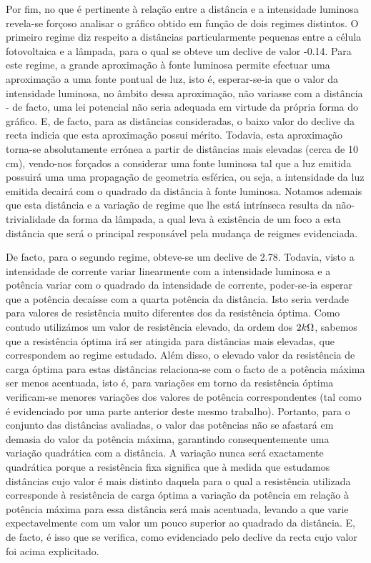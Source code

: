 \documentclass[9pt]{extarticle}
\begin{document}
\begin{multicols}{2}
\par Por fim, no que é pertinente à relação entre a distância e a intensidade luminosa revela-se forçoso analisar o gráfico obtido em função de dois regimes distintos. O primeiro regime diz respeito a distâncias particularmente pequenas entre a célula fotovoltaica e a lâmpada, para o qual se obteve um declive de valor -0.14. Para este regime, a grande aproximação à fonte luminosa permite efectuar uma aproximação a uma fonte pontual de luz, isto é, esperar-se-ia que o valor da intensidade luminosa, no âmbito dessa aproximação, não variasse com a distância - de facto, uma lei potencial não seria adequada em virtude da própria forma do gráfico. E, de facto, para as distâncias consideradas, o baixo valor do declive da recta indicia que esta aproximação possui mérito. Todavia, esta aproximação torna-se absolutamente errónea a partir de distâncias mais elevadas (cerca de 10 cm), vendo-nos forçados a considerar uma fonte luminosa tal que a luz emitida possuirá uma uma propagação de geometria esférica, ou seja, a intensidade da luz emitida decairá com o quadrado da distância à fonte luminosa. Notamos ademais que esta distância e a variação de regime que lhe está intrínseca resulta da não-trivialidade da forma da lâmpada, a qual leva à existência de um foco a esta distância que será o principal responsável pela mudança de reigmes evidenciada.

\par De facto, para o segundo regime, obteve-se um declive de 2.78. Todavia, visto a intensidade de corrente variar linearmente com a intensidade luminosa e a potência variar com o quadrado da intensidade de corrente, poder-se-ia esperar que a potência decaísse com a quarta potência da distância. Isto seria verdade para valores de resistência muito diferentes dos da resistência óptima. Como contudo utilizámos um valor de resistência elevado, da ordem dos $2k\ohm$, sabemos que a resistência óptima irá ser atingida para distâncias mais elevadas, que correspondem ao regime estudado. Além disso, o elevado valor da resistência de carga óptima para estas distâncias relaciona-se com o facto de a potência máxima ser menos acentuada, isto é, para variações em torno da resistência óptima verificam-se menores variações dos valores de potência correspondentes (tal como é evidenciado por uma parte anterior deste mesmo trabalho). Portanto, para o conjunto das distâncias avaliadas, o valor das potências não se afastará em demasia do valor da potência máxima, garantindo consequentemente uma variação quadrática com a distância. A variação nunca será exactamente quadrática porque a resistência fixa significa que à medida que estudamos distâncias cujo valor é mais distinto daquela para o qual a resistência utilizada corresponde à resistência de carga óptima a variação da potência em relação à potência máxima para essa distância será mais acentuada, levando a que varie expectavelmente com um valor um pouco superior ao quadrado da distância. E, de facto, é isso que se verifica, como evidenciado pelo declive da recta cujo valor foi acima explicitado.


\end{multicols}
\end{document}
